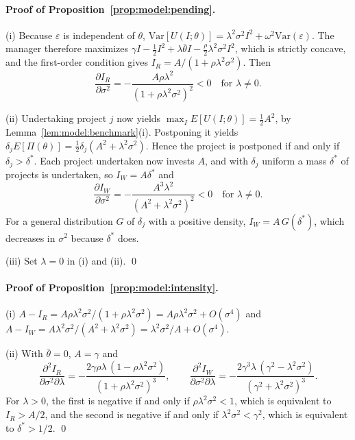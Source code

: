 \paragraph{Proof of Proposition~\ref{prop:model:pending}.}
(i) Because $\varepsilon$ is independent of $\theta$, $\mathrm{Var}[U(I;\theta)]=\lambda^{2}\sigma^{2}I^{2}+\omega^{2}\mathrm{Var}(\varepsilon)$. The manager therefore maximizes $\gamma I-\tfrac12 I^{2}+\lambda\bar\theta I-\tfrac{\rho}{2}\lambda^{2}\sigma^{2}I^{2}$, which is strictly concave, and the first-order condition gives $I_R=A/(1+\rho\lambda^{2}\sigma^{2})$. Then
\[
  \frac{\partial I_R}{\partial\sigma^{2}}=-\frac{A\rho\lambda^{2}}{(1+\rho\lambda^{2}\sigma^{2})^{2}}<0\quad\text{for }\lambda\neq0.
\]

(ii) Undertaking project $j$ now yields $\max_I E[U(I;\theta)]=\tfrac12A^{2}$, by Lemma~\ref{lem:model:benchmark}(i). Postponing it yields $\delta_jE[\Pi(\theta)]=\tfrac12\delta_j(A^{2}+\lambda^{2}\sigma^{2})$. Hence the project is postponed if and only if $\delta_j>\delta^{*}$. Each project undertaken now invests $A$, and with $\delta_j$ uniform a mass $\delta^{*}$ of projects is undertaken, so $I_W=A\delta^{*}$ and
\[
  \frac{\partial I_W}{\partial\sigma^{2}}=-\frac{A^{3}\lambda^{2}}{(A^{2}+\lambda^{2}\sigma^{2})^{2}}<0\quad\text{for }\lambda\neq0.
\]
For a general distribution $G$ of $\delta_j$ with a positive density, $I_W=A\,G(\delta^{*})$, which decreases in $\sigma^{2}$ because $\delta^{*}$ does.

(iii) Set $\lambda=0$ in (i) and (ii). \qed

\paragraph{Proof of Proposition~\ref{prop:model:intensity}.}
(i) $A-I_R=A\rho\lambda^{2}\sigma^{2}/(1+\rho\lambda^{2}\sigma^{2})=A\rho\lambda^{2}\sigma^{2}+O(\sigma^{4})$ and $A-I_W=A\lambda^{2}\sigma^{2}/(A^{2}+\lambda^{2}\sigma^{2})=\lambda^{2}\sigma^{2}/A+O(\sigma^{4})$.

(ii) With $\bar\theta=0$, $A=\gamma$ and
\[
  \frac{\partial^{2}I_R}{\partial\sigma^{2}\partial\lambda}=-\frac{2\gamma\rho\lambda\,(1-\rho\lambda^{2}\sigma^{2})}{(1+\rho\lambda^{2}\sigma^{2})^{3}},\qquad
  \frac{\partial^{2}I_W}{\partial\sigma^{2}\partial\lambda}=-\frac{2\gamma^{3}\lambda\,(\gamma^{2}-\lambda^{2}\sigma^{2})}{(\gamma^{2}+\lambda^{2}\sigma^{2})^{3}}.
\]
For $\lambda>0$, the first is negative if and only if $\rho\lambda^{2}\sigma^{2}<1$, which is equivalent to $I_R>A/2$, and the second is negative if and only if $\lambda^{2}\sigma^{2}<\gamma^{2}$, which is equivalent to $\delta^{*}>1/2$. \qed

